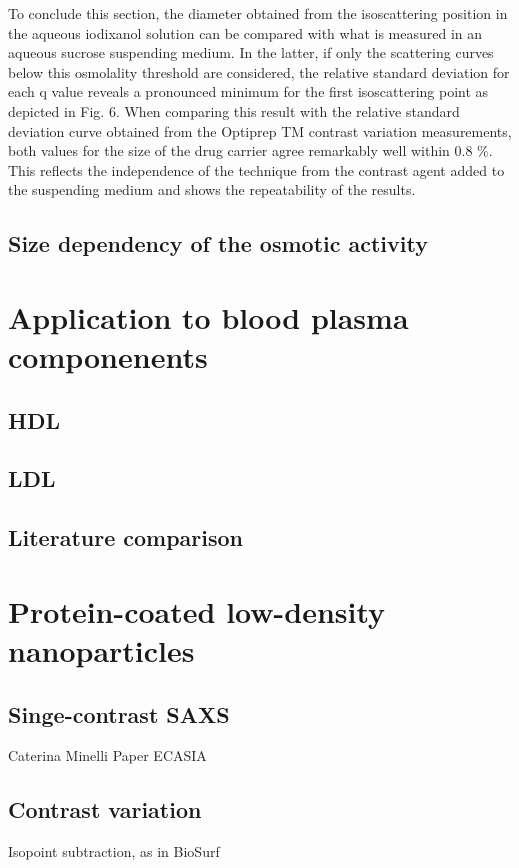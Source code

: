 To conclude this section, the diameter obtained from the isoscattering position in the aqueous iodixanol solution can be compared with what is measured in an aqueous sucrose suspending medium.  In the latter, if only the scattering curves below this osmolality threshold are considered, the relative standard deviation for each q value reveals a pronounced minimum for the first isoscattering point as depicted in Fig. 6. When comparing this result with the relative standard deviation curve obtained from the Optiprep TM contrast variation measurements, both values for the size of the drug carrier agree remarkably well within 0.8 $\%$. This reflects the independence of the technique from the contrast agent added to the suspending medium and shows the repeatability of the results.

\subsection{Size dependency of the osmotic activity}

\section{Application to blood plasma componenents}
\subsection{HDL}
\subsection{LDL}
\subsection{Literature comparison}

\section{Protein-coated low-density nanoparticles}
\subsection{Singe-contrast SAXS}
Caterina Minelli Paper ECASIA
\subsection{Contrast variation}
Isopoint subtraction, as in BioSurf

